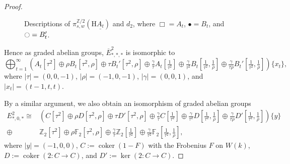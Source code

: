 \documentclass[10pt]{amsart}
\theoremstyle{definition}
\numberwithin{equation}{section}
\newcommand{\F}{\mathbb{F}}
\newcommand{\Z}{\mathbb{Z}}
\newcommand{\rH}{\mathrm{H}}
\newcommand{\ul}{\underline}
\newcommand{\ol}{\overline}
\DeclareMathOperator{\coker}{coker}
\begin{document}
{\begin{proof}
\begin{figure}
\caption{\label{figure1}
Descriptions of $\pi_{s,w}^{\Z/2}(\rH \ul{A_t})$ and $d_2$, where $\Box=A_t$, $\bullet=B_t$, and $\ocircle = B_t'$.}
\end{figure}
Hence as graded abelian groups,
$\ol{E}_{*,*,*}^2$ is isomorphic to
\[
\bigoplus_{t=1}^\infty (A_t[\tau^2] \oplus   \rho B_t [\tau^2,\rho]
\oplus \tau B_t' [\tau^2,\rho]
\oplus \tfrac{\gamma}{\tau} A_t[\tfrac{1}{\tau^2}] \oplus \tfrac{\gamma}{\tau^2} B_t [\tfrac{1}{\tau^2},\tfrac{1}{\rho}] \oplus \tfrac{\gamma}{\tau \rho} B_t'[\tfrac{1}{\tau^2},\tfrac{1}{\rho}])\{x_t\},
\]
where $\lvert \tau\rvert =(0,0,-1)$,
$\lvert \rho \rvert = (-1,0,-1)$,
$\lvert \gamma \rvert = (0,0,1)$,
and $\lvert x_t\rvert = (t-1,t,t)$.

By a similar argument,
we also obtain an isomorphism of graded abelian groups
\begin{align*}
E_{*,0,*}^2
\cong &
(C[\tau^2]
\oplus
\rho D[\tau^2,\rho]
\oplus
\tau D'[\tau^2,\rho]
\oplus
\tfrac{\gamma}{\tau} C[\tfrac{1}{\tau^2}]
\oplus
\tfrac{\gamma}{\tau^2}D [\tfrac{1}{\tau^2},\tfrac{1}{\rho}] \oplus \tfrac{\gamma}{\tau \rho} D'[\tfrac{1}{\tau^2},\tfrac{1}{\rho}])\{y\}
\\
\oplus &
\Z_2[\tau^2] \oplus \rho \F_2[\tau^2,\rho]
\oplus
\tfrac{\gamma}{\tau} \Z_2[\tfrac{1}{\tau^2}] \oplus \tfrac{\gamma}{\tau^2}\F_2 [\tfrac{1}{\tau^2},\tfrac{1}{\rho}],
\end{align*}
where $\lvert y\rvert = (-1,0,0)$,
$C:=\coker(1-F)$ with the Frobenius $F$ on $W(k)$,
$D:=\coker(2\colon C\to C)$,
and $D':=\ker(2\colon C\to C)$.


\end{proof}}
\end{document}
